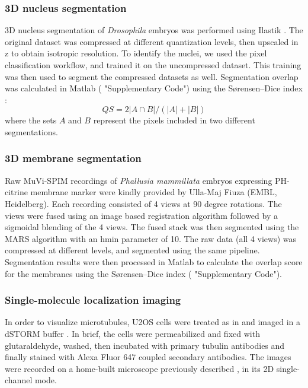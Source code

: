 \subsubsection{3D nucleus segmentation}
3D nucleus segmentation of \textit{Drosophila} embryos was performed using Ilastik \cite{sommer_ilastik:_2011}. The original dataset was compressed at different quantization levels, then upscaled in z to obtain isotropic resolution. To identify the nuclei, we used the pixel classification workflow, and trained it on the uncompressed dataset. This training was then used to segment the compressed datasets as well. Segmentation overlap was calculated in Matlab ( "Supplementary Code") using the Sørensen–Dice index \cite{sorensen_method_1948,dice_measures_1945}:
\begin{equation}
  QS = 2 \left| A \cap B \right| / \left( |A| + |B| \right)
\end{equation}
where the sets $A$ and $B$ represent the pixels included in two different segmentations.

\subsubsection{3D membrane segmentation}
Raw MuVi-SPIM recordings of \textit{Phallusia mammillata} embryos expressing PH-citrine membrane marker were kindly provided by Ulla-Maj Fiuza (EMBL, Heidelberg). Each recording consisted of 4 views at 90 degree rotations. The views were fused using an image based registration algorithm followed by a sigmoidal blending of the 4 views. The fused stack was then segmented using the MARS algorithm \cite{fernandez_imaging_2010} with an hmin parameter of 10. The raw data (all 4 views) was compressed at different levels, and segmented using the same pipeline. Segmentation results were then processed in Matlab to calculate the overlap score for the membranes using the Sørensen–Dice index ( "Supplementary Code").

\subsubsection{Single-molecule localization imaging}
In order to visualize microtubules, U2OS cells were treated as in \cite{deschamps_3d_2014} and imaged in a dSTORM buffer \cite{heilemann_subdiffraction-resolution_2008}. In brief, the cells were permeabilized and fixed with glutaraldehyde, washed, then incubated with primary tubulin antibodies and finally stained with Alexa Fluor 647 coupled secondary antibodies. The images were recorded on a home-built microscope previously described \cite{deschamps_3d_2014}, in its 2D single-channel mode.

